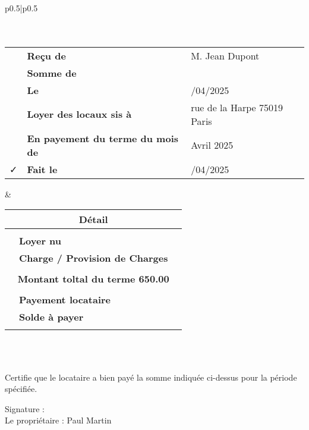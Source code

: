 \documentclass{article}
\begin{document}
\begin{tabular}{p{}|p{}}
	\hline 	
	\\
		\\
	\hline 
	\\
	\begin{tabular}{c>{\raggedleft\arraybackslash}p{}>{\raggedright\arraybackslash}p{}}
		\faFile{} &  \textbf{Reçu de} & M. Jean Dupont\\
		\faMoney & 	\textbf{Somme de}	 & 650.00 \EURdig\\
		\faCalendar & \textbf{Le} & 08/04/2025\\
		\faMapMarker & \textbf{Loyer des locaux sis à } & 6 rue de la Harpe 75019 Paris\\
		\faPencil & \textbf{En payement du terme du mois de} & Avril 2025\\
		\faCheck & \textbf{Fait le} & 17/04/2025\\
	\end{tabular}
	& \setlength{\arrayrulewidth}{2pt} %
	\begin{tabular}{c>{\raggedleft\arraybackslash}p{}>{\raggedright\arraybackslash}p{}}	
		\multicolumn{3}{c}{\bf Détail}\\
		\hline \\
		\faHome{} & \textbf{Loyer nu} & 580.0 \EURdig	\\
		\faBolt{} & \textbf{Charge / Provision de Charges} &  70.0 \EURdig	\\
		\\
		\multicolumn{3}{c}{\bf Montant toltal du terme 650.00 \EURdig }\\
		\hline \\
		\faMoney{} & \textbf{Payement locataire} & 600.00 \EURdig	\\
		\faExclamationTriangle{} & \textbf{Solde à payer} &  50.00 \EURdig	\\
		&\\
	\end{tabular}\\
	\hline
    \\
    \hline
\end{tabular}






\vspace{1cm}

\noindent
Certifie que le locataire a bien payé la somme indiquée ci-dessus pour la période spécifiée.

\vspace{2cm}

\noindent
Signature : \\
Le propriétaire : Paul Martin
\end{document}
